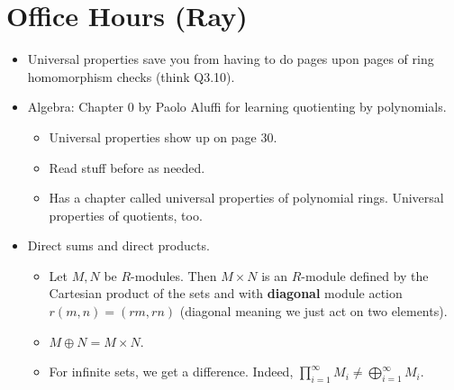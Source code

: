 \documentclass[../notes.tex]{subfiles}
\begin{document}
\section{Office Hours (Ray)}
\begin{itemize}
    \item Universal properties save you from having to do pages upon pages of ring homomorphism checks (think Q3.10).
    \item Algebra: Chapter 0 by Paolo Aluffi for learning quotienting by polynomials.
    \begin{itemize}
        \item Universal properties show up on page 30.
        \item Read stuff before as needed.
        \item Has a chapter called universal properties of polynomial rings. Universal properties of quotients, too.
    \end{itemize}
    \item Direct sums and direct products.
    \begin{itemize}
        \item Let $M,N$ be $R$-modules. Then $M\times N$ is an $R$-module defined by the Cartesian product of the sets and with \textbf{diagonal} module action $r(m,n)=(rm,rn)$ (diagonal meaning we just act on two elements).
        \item $M\oplus N=M\times N$.
        \item For infinite sets, we get a difference. Indeed, $\prod_{i=1}^\infty M_i\neq\bigoplus_{i=1}^\infty M_i$.
    \end{itemize}
\end{itemize}
\end{document}
